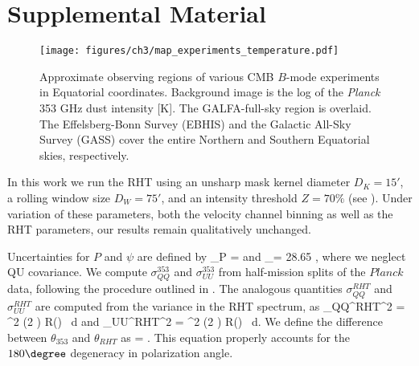 \section{Supplemental Material}

\begin{figure*}[h]
\centering
\texttt{[image: figures/ch3/map\_experiments\_temperature.pdf]}
\caption{Approximate observing regions of various CMB $B$-mode experiments in Equatorial coordinates. Background image is the log of the \textit{Planck} 353 GHz dust intensity [K]. The GALFA-\hi full-sky region is overlaid. The Effelsberg-Bonn \hi Survey (EBHIS) and the Galactic All-Sky Survey (GASS) cover the entire Northern and Southern Equatorial skies, respectively. \label{explocs}}
\end{figure*}

In this work we run the RHT using an unsharp mask kernel diameter $D_K = 15'$, a rolling window size $D_W = 75'$, and an intensity threshold $Z = 70\%$ (see \cite{Clark:2014it}). Under variation of these parameters, both the velocity channel binning as well as the RHT parameters, our results remain qualitatively unchanged.

Uncertainties for $P$ and $\psi$ are defined by
\beq
\sigma_P =  
\eeq
and
\beq
\sigma_\psi = 28.65\degree {} \cdot {},
\eeq
where we neglect QU covariance. We compute $\sigma_{QQ}^{353}$ and $\sigma_{UU}^{353}$ from half-mission splits of the $Planck$ data, following the procedure outlined in \cite{Collaboration:2015ta}. The analogous quantities $\sigma_{QQ}^{RHT}$ and $\sigma_{UU}^{RHT}$ are computed from the variance in the RHT spectrum, as
\beq
{\sigma_{QQ}^{RHT}}^2 = \int {}^2 \left(2 \theta \right) \cdot R\left(\theta\right) \, d\theta
\eeq
and
\beq
{\sigma_{UU}^{RHT}}^2 = \int {}^2 \left(2 \theta \right) \cdot R\left(\theta\right) \, d\theta.
\eeq
We define the difference between $\theta_{353}$ and $\theta_{RHT}$ as
\beq
\delta \theta =   .
\eeq
This equation properly accounts for the $180\degree$ degeneracy in polarization angle.

